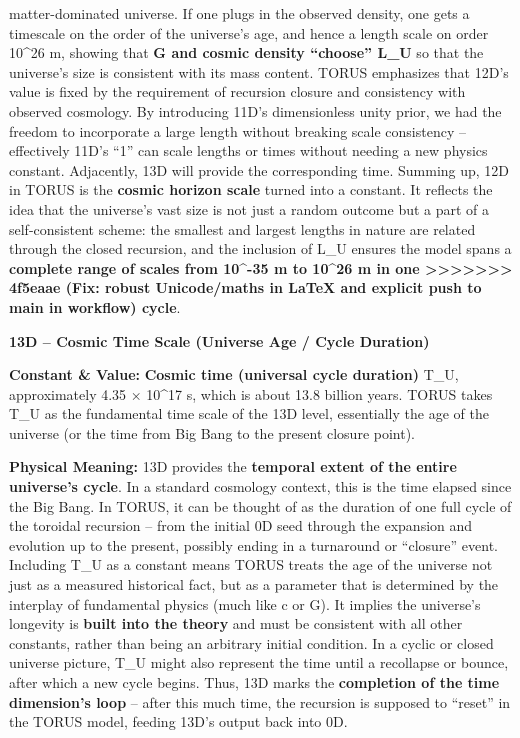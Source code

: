 \documentclass[]{article}
\begin{document}
{matter-dominated universe​. If one plugs in the observed density, one
gets a timescale on the order of the universe's age, and hence a length
scale on order 10\^{}26 m, showing that \textbf{G and cosmic density
``choose'' L\_U} so that the universe's size is consistent with its mass
content. TORUS emphasizes that 12D's value is fixed by the requirement
of recursion closure and consistency with observed cosmology​. By
introducing 11D's dimensionless unity prior, we had the freedom to
incorporate a large length without breaking scale consistency --
effectively 11D's ``1'' can scale lengths or times without needing a new
physics constant​. Adjacently, 13D will provide the corresponding time.
Summing up, 12D in TORUS is the \textbf{cosmic horizon scale} turned
into a constant. It reflects the idea that the universe's vast size is
not just a random outcome but a part of a self-consistent scheme: the
smallest and largest lengths in nature are related through the closed
recursion, and the inclusion of L\_U ensures the model spans a
\textbf{complete range of scales from 10\^{}-35 m to 10\^{}26 m in one
>>>>>>> 4f5eaae (Fix: robust Unicode/maths in LaTeX and explicit push to main in workflow)
cycle}.

\textbf{13D -- Cosmic Time Scale (Universe Age / Cycle Duration)}

\textbf{Constant \& Value:} \textbf{Cosmic time (universal cycle
duration)} T\_U, approximately 4.35 × 10\^{}17 s​, which is about 13.8
billion years. TORUS takes T\_U as the fundamental time scale of the 13D
level, essentially the age of the universe (or the time from Big Bang to
the present closure point).

\textbf{Physical Meaning:} 13D provides the \textbf{temporal extent of
the entire universe's cycle}. In a standard cosmology context, this is
the time elapsed since the Big Bang. In TORUS, it can be thought of as
the duration of one full cycle of the toroidal recursion -- from the
initial 0D seed through the expansion and evolution up to the present,
possibly ending in a turnaround or ``closure'' event​. Including T\_U as
a constant means TORUS treats the age of the universe not just as a
measured historical fact, but as a parameter that is determined by the
interplay of fundamental physics (much like c or G). It implies the
universe's longevity is \textbf{built into the theory} and must be
consistent with all other constants, rather than being an arbitrary
initial condition​. In a cyclic or closed universe picture, T\_U might
also represent the time until a recollapse or bounce, after which a new
cycle begins. Thus, 13D marks the \textbf{completion of the time
dimension's loop} -- after this much time, the recursion is supposed to
``reset'' in the TORUS model, feeding 13D's output back into 0D.

}
\end{document}
